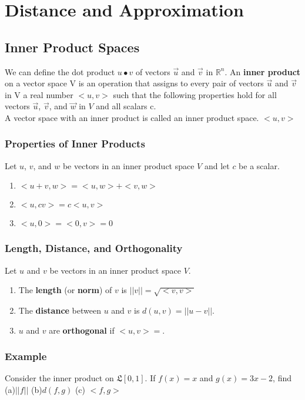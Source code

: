\setcounter{chapter}{6}
\chapter{Distance and Approximation}

\section{Inner Product Spaces}
We can define the dot product $u \bullet v$ of vectors $\vec{u}$ and $\vec{v}$ in $\mathbb{R}^n$. 
An \textbf{inner product} on a vector space V is an operation that assigns to every pair of vectors $\vec{u}$ and $\vec{v}$ in V a real number $<u,v>$ such 
that the following properties hold for all vectors $\vec{u}$, $\vec{v}$, and $\vec{w}$ in $V$ and all scalars c.\\

A vector space with an inner product is called an inner product space. $<u,v>$

\subsection{Properties of Inner Products}
Let $u$, $v$, and $w$ be vectors in an inner product space $V$ and let $c$ be a scalar.
\begin{enumerate}
    \item $<u+v, w> = <u,w> + <v,w>$
    \item $<u, cv> = c<u, v>$
    \item $<u, 0> = <0, v> = 0$
\end{enumerate}

\subsection{Length, Distance, and Orthogonality}
Let $u$ and $v$ be vectors in an inner product space $V$.
\begin{enumerate}
    \item The \textbf{length} (or \textbf{norm}) of $v$ is $||v|| = \sqrt{<v,v>}$
    \item The \textbf{distance} between $u$ and $v$ is $d(u,v) = ||u - v||$.
    \item $u$ and $v$ are \textbf{orthogonal} if $<u, v> = $. 
\end{enumerate}
\subsection*{Example}
Consider the inner product on $\mathfrak{L}[0,1]$. If $f(x) = x$ and $g(x) = 3x-2$, find\\
(a)$||f||$ (b)$d(f,g)$ (c) $<f,g>$
